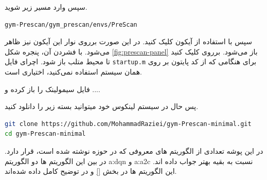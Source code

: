 سپس وارد مسیر زیر شوید.
\begin{center}
\begin{latin}
\begin{verbatim}
gym-Prescan/gym_prescan/envs/PreScan
\end{verbatim}
\end{latin}
\end{center}

سپس با استفاده از آیکون 
کلیک کنید. در این صورت برروی نوار  این آیکون نیز ظاهر می‌شود. با فشردن آن،
 پنجره شکل 
\ref{fig:prescan-panel}
باز می‌شود. برروی  کلیک کنید تا محیط متلب باز شود. اچرای فایل \texttt{startup.m} برای هنگامی که از کد پایتون بر روی همان سیستم استفاده نمی‌کنید، اختیاری است. 

فایل سیمولینک را باز کرده و ....



پس حال در سیستم لینکوس خود میتوانید بسته زیر را دانلود کنید.

\begin{latin}
\begin{lstlisting}[language=bash]
git clone https://github.com/MohammadRaziei/gym-Prescan-minimal.git
cd gym-Prescan-minimal
\end{lstlisting}
\end{latin}

در این پوشه تعدادی از الگوریتم های معروفی که در حوزه  نوشته شده است، قرار دارد.
در بین این الگوریتم ها دو الگوریتم \gls{a:dqn} و \gls{a:a2c} نسبت به بقیه بهتر جواب داده اند. این الگوریتم ها در بخش 
\ref{}
و در 
\cite{stable-baselines}
توضیح کامل داده شده‌اند.


























